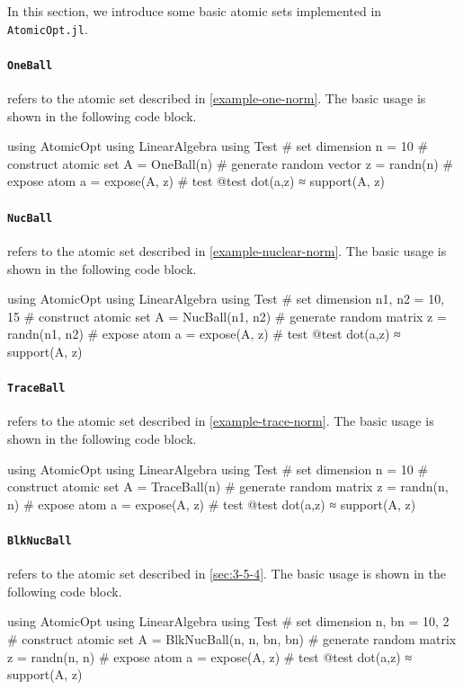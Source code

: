 In this section, we introduce some basic atomic sets implemented in \texttt{AtomicOpt.jl}. 

\paragraph{\texttt{OneBall}} refers to the atomic set described in \autoref{example-one-norm}. The basic usage is shown in the following code block. 
\begin{code}
  using AtomicOpt
  using LinearAlgebra
  using Test
  # set dimension
  n = 10
  # construct atomic set 
  A = OneBall(n)
  # generate random vector
  z = randn(n)
  # expose atom
  a = expose(A, z)
  # test
  @test dot(a,z) ≈ support(A, z)
\end{code}

\paragraph{\texttt{NucBall}} refers to the atomic set described in \autoref{example-nuclear-norm}. The basic usage is shown in the following code block. 
\begin{code}
  using AtomicOpt
  using LinearAlgebra
  using Test
  # set dimension
  n1, n2 = 10, 15
  # construct atomic set 
  A = NucBall(n1, n2)
  # generate random matrix
  z = randn(n1, n2)
  # expose atom
  a = expose(A, z)
  # test
  @test dot(a,z) ≈ support(A, z)
\end{code}

\paragraph{\texttt{TraceBall}} refers to the atomic set described in \autoref{example-trace-norm}. The basic usage is shown in the following code block. 
\begin{code}
  using AtomicOpt
  using LinearAlgebra
  using Test
  # set dimension
  n = 10
  # construct atomic set 
  A = TraceBall(n)
  # generate random matrix
  z = randn(n, n)
  # expose atom
  a = expose(A, z)
  # test
  @test dot(a,z) ≈ support(A, z)
\end{code}

\paragraph{\texttt{BlkNucBall}} refers to the atomic set described in \autoref{sec:3-5-4}. The basic usage is shown in the following code block. 
\begin{code}
  using AtomicOpt
  using LinearAlgebra
  using Test
  # set dimension
  n, bn = 10, 2
  # construct atomic set 
  A = BlkNucBall(n, n, bn, bn)
  # generate random matrix
  z = randn(n, n)
  # expose atom
  a = expose(A, z)
  # test
  @test dot(a,z) ≈ support(A, z)
\end{code}


